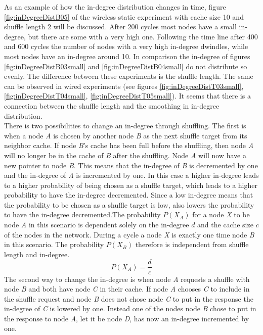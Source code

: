 As an example of how the in-degree distribution changes in time, figure
\ref{fig:inDegreeDistB05} of the wireless static experiment with cache size 10 and shuffle
length 2 will be discussed. After 200 cycles most nodes have a small in-degree,
but there are some with a very high one. Following the time line after 400 and
600 cycles the number of nodes with a very high in-degree dwindles, while most
nodes have an in-degree around 10. In comparison the in-degree of figures
\ref{fig:inDegreeDistB03small} and \ref{fig:inDegreeDistB04small} do not
distribute so evenly. The difference between these experiments is the shuffle
length. The same can be observed in wired experiments (see figures
\ref{fig:inDegreeDistT03small},
\ref{fig:inDegreeDistT04small}, \ref{fig:inDegreeDistT05small}). It seems that
there is a connection between the shuffle length and the smoothing in in-degree distribution.\\
There is two possibilities to change an in-degree through shuffling. The first
is when a node \emph{A} is chosen by another node \emph{B} as the next shuffle
target from its neighbor cache. If node \emph{B}'s cache has been full before
the shuffling, then node \emph{A} will no longer be in the cache of \emph{B}
after the shuffling. Node \emph{A} will now have a new pointer to node \emph{B}.
This means that the in-degree of \emph{B} is decremented by one and the
in-degree of \emph{A} is incremented by one. In this case a higher in-degree leads to a higher probability of being chosen as a shuffle target, which leads to a higher
probability to have the in-degree decremented. Since a
low in-degree means that the probability to be chosen as a shuffle target is low, also lowers the
probability to have the in-degree decremented.The probability $P(X_A)$ for a
node \emph{X} to be node \emph{A} in this scenario is dependent solely on the
in-degree $d$ and the cache size $c$ of the nodes in the network. During a cycle
a node \emph{X} is exactly one time node \emph{B} in this scenario. The
probability $P(X_B)$ therefore is independent from
shuffle length and in-degree. \[P(X_A) = \frac{d}{c}\]
The second way to change the in-degree is when node \emph{A} requests a shuffle
with node \emph{B} and both have node \emph{C} in their cache. If node \emph{A}
chooses \emph{C} to include in the shuffle request and node \emph{B} does not
chose node \emph{C} to put in the response the in-degree of \emph{C} is lowered
by one. Instead one of the nodes node \emph{B} chose to put in the response to
node \emph{A}, let it be node \emph{D}, has now an in-degree incremented by one.
